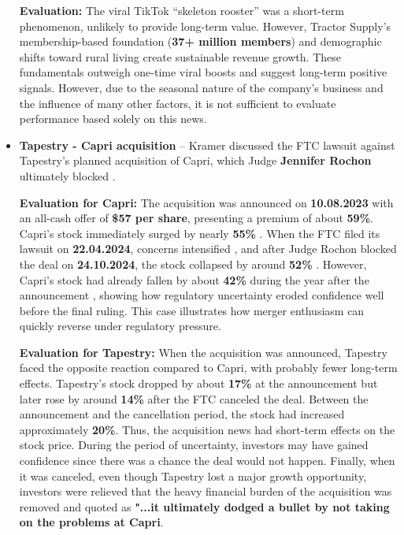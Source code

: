 \documentclass[12pt,a4paper]{article}
\begin{document}
\begin{itemize}
     \textbf{Evaluation:} The viral TikTok “skeleton rooster” was a short-term phenomenon, unlikely to provide long-term value. 
    However, Tractor Supply’s membership-based foundation (\textbf{37+ million members}) 
    and demographic shifts toward rural living create sustainable revenue growth. 
    These fundamentals outweigh one-time viral boosts and suggest long-term positive signals. However, due to the seasonal nature of the company’s business and the influence of many other factors, it is not sufficient to evaluate performance based solely on this news.
\vspace{0.7cm}


    \item \textbf{Tapestry - Capri acquisition} -- Kramer discussed the FTC lawsuit against Tapestry’s planned acquisition of Capri, 
    which Judge \textbf{Jennifer Rochon} ultimately blocked \cite{ftc}. 
\vspace{0.3cm}
    
\textbf{Evaluation for Capri:} The acquisition was announced on \textbf{10.08.2023} with an all-cash 
offer of \textbf{\$57 per share}, presenting a premium of about \textbf{59\%}. 
Capri’s stock immediately surged by nearly \textbf{55\%} \cite{CPRI}. 
When the FTC filed its lawsuit on \textbf{22.04.2024}, concerns intensified \cite{ftc}, 
and after Judge Rochon blocked the deal on \textbf{24.10.2024}, 
the stock collapsed by around \textbf{52\%} \cite{CPRI}. 
However, Capri’s stock had already fallen by about \textbf{42\%} during the year after the announcement \cite{CPRI}, 
showing how regulatory uncertainty eroded confidence well before the final ruling. 
This case illustrates how merger enthusiasm can quickly reverse under regulatory pressure.

\newpage
\textbf{Evaluation for Tapestry:} When the acquisition was announced, Tapestry faced the opposite reaction compared to Capri, with probably fewer long-term effects. Tapestry’s stock dropped by about \textbf{17\%} at the announcement but later rose by around \textbf{14\%} after the FTC canceled the deal. Between the announcement and the cancellation period, the stock had increased approximately \textbf{20\%}. Thus, the acquisition news had short-term effects on the stock price. During the period of uncertainty, investors may have gained confidence since there was a chance the deal would not happen. Finally, when it was canceled, even though Tapestry lost a major growth opportunity, investors were relieved that the heavy financial burden of the acquisition was removed and quoted as \textbf{"...it ultimately dodged a bullet by not taking on the problems at Capri}.\cite{forbesTapestry}

\end{itemize}
\end{document}
